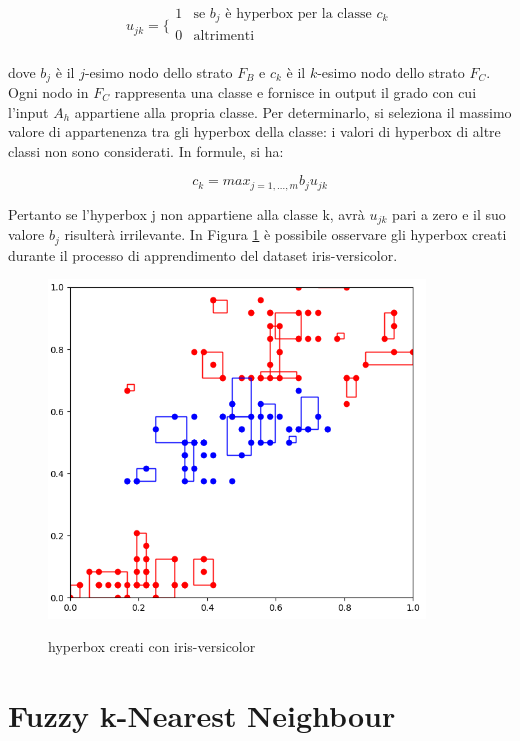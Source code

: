 \documentclass[11pt,  oneside, openany]{book}
\begin{document}
$$ u_{jk} = \bigg \{ 
\begin{array}{rl}
1 &\text{se } b_j \text{ è hyperbox per la classe } c_k \\
0 & \text{altrimenti} \\
\end{array}
$$

\noindent dove $b_j$ è il $j$-esimo nodo dello strato $ F_B$ e  $c_k$ è il $k$-esimo nodo dello strato $ F_C$. Ogni nodo in $F_C$ rappresenta una classe e fornisce in output il grado con cui l'input $A_h$ appartiene alla propria classe. Per determinarlo, si seleziona il massimo valore di appartenenza tra gli hyperbox della classe: i valori di hyperbox di altre classi non sono considerati. In formule, si ha: 

$$ c_k = max_{j = 1, \dots, m} b_j u_{jk} $$

Pertanto se l'hyperbox j non appartiene alla classe k, avrà $u_{jk} $ pari a zero e il suo valore $b_j$ risulterà irrilevante. 
In Figura \ref{fmm_hyperbox} è possibile osservare gli hyperbox creati durante il processo di apprendimento del dataset iris-versicolor. 

\begin{figure}[h!]
\begin{center}
  \includegraphics[width=10cm]{Immagini/hyperbox_created_irisversicolor.png}\\
  \caption{hyperbox creati con iris-versicolor}
  \label{fmm_hyperbox}
\end{center}
\end{figure}



	\section{Fuzzy k-Nearest Neighbour}
\end{document}
